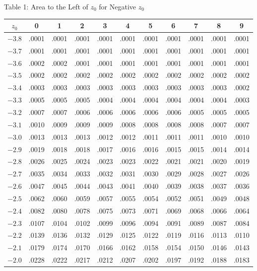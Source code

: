 \documentclass[11pt]{article}
\begin{document}
\begin{distbox}{Table 1: Area to the Left of $z_0$ for Negative $z_0$}
\begin{tabular}{c|cccccccccc}
\toprule
$z_0$ & 0 & 1 & 2 & 3 & 4 & 5 & 6 & 7 & 8 & 9 \\
\midrule
$-3.8$ & .0001 & .0001 & .0001 & .0001 & .0001 & .0001 & .0001 & .0001 & .0001 & .0001 \\
$-3.7$ & .0001 & .0001 & .0001 & .0001 & .0001 & .0001 & .0001 & .0001 & .0001 & .0001 \\
$-3.6$ & .0002 & .0002 & .0001 & .0001 & .0001 & .0001 & .0001 & .0001 & .0001 & .0001 \\
$-3.5$ & .0002 & .0002 & .0002 & .0002 & .0002 & .0002 & .0002 & .0002 & .0002 & .0002 \\
$-3.4$ & .0003 & .0003 & .0003 & .0003 & .0003 & .0003 & .0003 & .0003 & .0003 & .0002 \\
$-3.3$ & .0005 & .0005 & .0005 & .0004 & .0004 & .0004 & .0004 & .0004 & .0004 & .0003 \\
$-3.2$ & .0007 & .0007 & .0006 & .0006 & .0006 & .0006 & .0006 & .0005 & .0005 & .0005 \\
$-3.1$ & .0010 & .0009 & .0009 & .0009 & .0008 & .0008 & .0008 & .0008 & .0007 & .0007 \\
$-3.0$ & .0013 & .0013 & .0013 & .0012 & .0012 & .0011 & .0011 & .0011 & .0010 & .0010 \\
$-2.9$ & .0019 & .0018 & .0018 & .0017 & .0016 & .0016 & .0015 & .0015 & .0014 & .0014 \\
$-2.8$ & .0026 & .0025 & .0024 & .0023 & .0023 & .0022 & .0021 & .0021 & .0020 & .0019 \\
$-2.7$ & .0035 & .0034 & .0033 & .0032 & .0031 & .0030 & .0029 & .0028 & .0027 & .0026 \\
$-2.6$ & .0047 & .0045 & .0044 & .0043 & .0041 & .0040 & .0039 & .0038 & .0037 & .0036 \\
$-2.5$ & .0062 & .0060 & .0059 & .0057 & .0055 & .0054 & .0052 & .0051 & .0049 & .0048 \\
$-2.4$ & .0082 & .0080 & .0078 & .0075 & .0073 & .0071 & .0069 & .0068 & .0066 & .0064 \\
$-2.3$ & .0107 & .0104 & .0102 & .0099 & .0096 & .0094 & .0091 & .0089 & .0087 & .0084 \\
$-2.2$ & .0139 & .0136 & .0132 & .0129 & .0125 & .0122 & .0119 & .0116 & .0113 & .0110 \\
$-2.1$ & .0179 & .0174 & .0170 & .0166 & .0162 & .0158 & .0154 & .0150 & .0146 & .0143 \\
$-2.0$ & .0228 & .0222 & .0217 & .0212 & .0207 & .0202 & .0197 & .0192 & .0188 & .0183 \\

\end{tabular}
\end{distbox}
\end{document}
